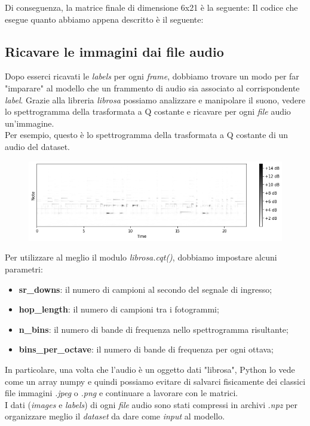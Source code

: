 \newline
Di conseguenza, la matrice finale di dimensione 6x21 è la seguente:
\vspace*{2ex}
\vspace*{2ex}
Il codice che esegue quanto abbiamo appena descritto è il seguente:
\vspace*{2ex}
\subsection{Ricavare le immagini dai file audio}
Dopo esserci ricavati le \textit{labels} per ogni \textit{frame}, dobbiamo trovare un modo per far "imparare" al modello che un frammento di audio sia associato al corrispondente \textit{label}.
Grazie alla libreria \textit{librosa} possiamo analizzare e manipolare il suono, vedere lo spettrogramma della trasformata a Q costante e ricavare per ogni \textit{file} audio un'immagine.\\
\newline
Per esempio, questo è lo spettrogramma della trasformata a Q costante di un audio del dataset.
\begin{figure}[H]
	\centering
	\includegraphics[scale=0.60]{./images/img7.png}
\end{figure}
Per utilizzare al meglio il modulo \textit{librosa.cqt()}, dobbiamo impostare alcuni parametri:
\begin{itemize}
	\item \textbf{sr\_downs}: il numero di campioni al secondo del segnale di ingresso;
	\item \textbf{hop\_length}: il numero di campioni tra i fotogrammi;
	\item \textbf{n\_bins}: il numero di bande di frequenza nello spettrogramma risultante;
	\item \textbf{bins\_per\_octave}: il numero di bande di frequenza per ogni ottava;
\end{itemize}
\vspace*{2ex}
\vspace*{2ex}
In particolare, una volta che l'audio è un oggetto dati "librosa", Python lo vede come un array numpy e quindi possiamo evitare di salvarci fisicamente dei classici file immagini \textit{.jpeg} o \textit{.png} e continuare a lavorare con le matrici.\\
\newline
I dati (\textit{images} e \textit{labels}) di ogni \textit{file} audio sono stati compressi in archivi .\textit{npz} per organizzare meglio il \textit{dataset} da dare come \textit{input} al modello.
\vspace*{2ex}
\vspace*{2ex}
